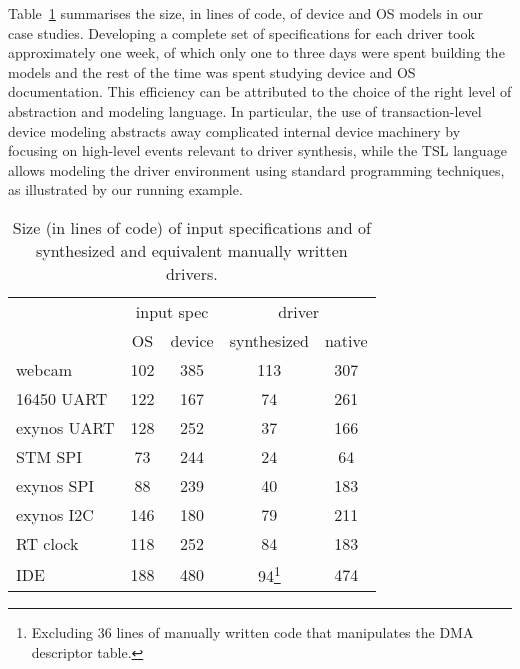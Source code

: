 \documentclass{book}
\newcommand{\tsl}{TSL\xspace}
\theoremstyle{definition}
\begin{document}
Table~\ref{t:size} summarises the size, in lines of code, of device and OS models in our case studies.  Developing a complete set of specifications for each driver took approximately one week, of which only one to three days were spent building the models and the rest of the time was spent studying device and OS documentation.  This efficiency can be attributed to the choice of the right level of abstraction and modeling language.  In particular, the use of transaction-level device modeling abstracts away complicated internal device machinery by focusing on high-level events relevant to driver synthesis, while the \tsl language allows modeling the driver environment using standard programming techniques, as illustrated by our running example.

\begin{table}
    \begin{minipage}{\linewidth}
    \center
    \begin{tabular}{|l|c|c|c|c|}
        \hline
        & \multicolumn{2}{|c|}{input spec} & \multicolumn{2}{c|}{driver} \\
        \cline{2-5}
                     & OS  & device & synthesized & native \\
        \hline
        \hline
        webcam       & 102 & 385    & 113         & 307 \\
        16450 UART   & 122 & 167    & 74          & 261 \\
        exynos UART  & 128 & 252    & 37          & 166 \\
        STM SPI      & 73  & 244    & 24          & 64  \\
        exynos SPI   & 88  & 239    & 40          & 183 \\
        exynos I2C   & 146 & 180    & 79          & 211 \\
        RT clock     & 118 & 252    & 84          & 183 \\
        IDE          & 188 & 480    & 94\footnote{Excluding 36 lines of manually written code that manipulates the DMA descriptor table.} & 474 \\
        \hline
    \end{tabular}
    \end{minipage}
    \caption{Size (in lines of code) of input specifications and of synthesized and equivalent manually written drivers.}
    \label{t:size}
\end{table}
\end{document}
